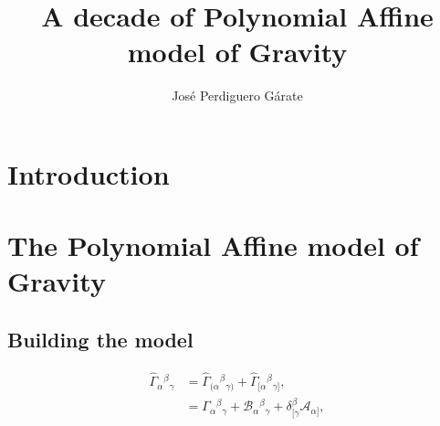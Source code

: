 \documentclass{article}
\title{A decade of Polynomial Affine model of Gravity}
\author{Jos\'e Perdiguero G\'arate}
\providecommand{\ctG}[3]{\Gamma_{#1}{}^{ #2}{}_{#3}}
\providecommand{\B}[3]{\mathcal{B}_{#1}{}^{ #2}{}_{#3}}
\providecommand{\A}[1]{\mathcal{A}_{#1}}
\begin{document}
\maketitle
\tableofcontents

\section{Introduction}
\label{sec:introduction}


\section{The Polynomial Affine model of Gravity}
\label{sec:pag}


\subsection{Building the model}
\label{subsec:building the model}

\begin{equation}
\begin{aligned}
    \label{affine_connection}
    \hat{\Gamma}_{\alpha}{}^{\beta}{}_{\gamma} & = \hat{\Gamma}_{(\alpha}{}^{\beta}{}_{\gamma)} +  \hat{\Gamma}_{[\alpha}{}^{\beta}{}_{\gamma]},  \\
    & = \ctG{\alpha}{\beta}{\gamma} + \B{\alpha}{\beta}{\gamma} + \delta^{\beta}_{[\gamma}\A{\alpha]},
\end{aligned}
\end{equation}
\end{document}
